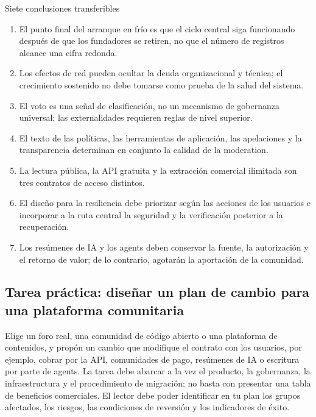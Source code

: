 \documentclass[a4paper]{article}
\begin{document}
\begin{importantbox}{Siete conclusiones transferibles}
\begin{enumerate}
  \item El punto final del arranque en frío es que el ciclo central siga funcionando después de que los fundadores se retiren, no que el número de registros alcance una cifra redonda.
  \item Los efectos de red pueden ocultar la deuda organizacional y técnica; el crecimiento sostenido no debe tomarse como prueba de la salud del sistema.
  \item El voto es una señal de clasificación, no un mecanismo de gobernanza universal; las externalidades requieren reglas de nivel superior.
  \item El texto de las políticas, las herramientas de aplicación, las apelaciones y la transparencia determinan en conjunto la calidad de la moderation.
  \item La lectura pública, la API gratuita y la extracción comercial ilimitada son tres contratos de acceso distintos.
  \item El diseño para la resiliencia debe priorizar según las acciones de los usuarios e incorporar a la ruta central la seguridad y la verificación posterior a la recuperación.
  \item Los resúmenes de IA y los agents deben conservar la fuente, la autorización y el retorno de valor; de lo contrario, agotarán la aportación de la comunidad.
\end{enumerate}
\end{importantbox}

\subsection{Tarea práctica: diseñar un plan de cambio para una plataforma comunitaria}

Elige un foro real, una comunidad de código abierto o una plataforma de contenidos, y propón un cambio que modifique el contrato con los usuarios, por ejemplo, cobrar por la API, comunidades de pago, resúmenes de IA o escritura por parte de agents. La tarea debe abarcar a la vez el producto, la gobernanza, la infraestructura y el procedimiento de migración; no basta con presentar una tabla de beneficios comerciales. El lector debe poder identificar en tu plan los grupos afectados, los riesgos, las condiciones de reversión y los indicadores de éxito.
\end{document}
